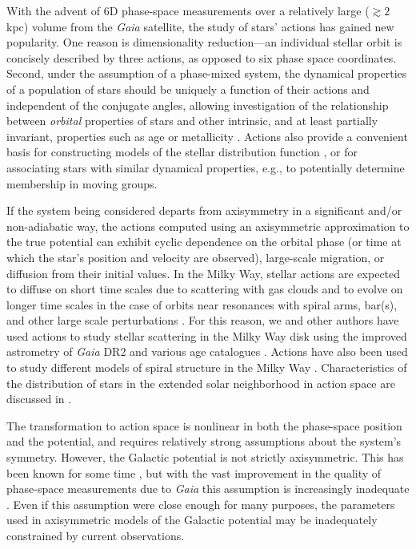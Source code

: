 \documentclass[twocolumn]{aastex62}
\begin{document}
With the advent of 6D phase-space measurements over a relatively large
($\gtrsim 2$ kpc) volume from the \textit{Gaia} satellite, the study of stars'
actions has gained new popularity. One reason is dimensionality reduction---an
individual stellar orbit is concisely described by three actions, as opposed
to six phase space coordinates. Second, under the assumption of a phase-mixed
system, the dynamical properties of a population of stars should be uniquely a
function of their actions and independent of the conjugate angles, allowing
investigation of the relationship between \emph{orbital} properties of stars
and other intrinsic, and at least partially invariant, properties such as age
or metallicity \citep{2018ApJ...867...31B, 2018arXiv180803278T,
2018MNRAS.481.4093S, 2019arXiv190304030G, 2019arXiv190309320D,
2019MNRAS.486.1167B}. Actions also provide a convenient basis for constructing
models of the stellar distribution function
\citep[e.g.][]{1915MNRAS..76...70J, 1985ApJ...295..388V, 2017ApJ...839...61T},
or for associating stars with similar dynamical properties, e.g., to
potentially determine membership in moving groups.

If the system being considered departs from axisymmetry in a significant
and/or non-adiabatic way, the actions computed using an axisymmetric
approximation to the true potential can exhibit cyclic dependence on the
orbital phase (or time at which the star's position and velocity are
observed), large-scale migration, or diffusion from their initial values. In
the Milky Way, stellar actions are expected to diffuse on short time scales
due to scattering with gas clouds and to evolve on longer time scales in the
case of orbits near resonances with spiral arms, bar(s), and other large scale
perturbations \citep{2014RvMP...86....1S}. For this reason, we and other
authors have used actions to study stellar scattering in the Milky Way disk
using the improved astrometry of \textit{Gaia} DR2 and various age catalogues
\citep{2018ApJ...867...31B, 2018arXiv180803278T}. Actions have also been used
to study different models of spiral structure in the Milky Way
\citep{2019MNRAS.tmp..155S}. Characteristics of the distribution of stars in
the extended solar neighborhood in action space are discussed in
\citet{2019MNRAS.484.3291T}.

The transformation to action space is nonlinear in both the phase-space
position and the potential, and requires relatively strong assumptions about
the system's symmetry. However, the Galactic potential is not strictly
axisymmetric. This has been known for some time \citep[e.g.][]{1957AJ.....62...93K,2009MNRAS.396L..56M, 2012ApJ...750L..41W}, but with the vast improvement in the quality of phase-space
measurements due to \textit{Gaia} this assumption is increasingly
inadequate \citep[e.g.][]{2018Natur.561..360A, 2019MNRAS.485.3134L}. Even if this assumption were
close enough for many purposes, the parameters used in axisymmetric models of the Galactic potential may
be inadequately constrained by current observations.
\end{document}
